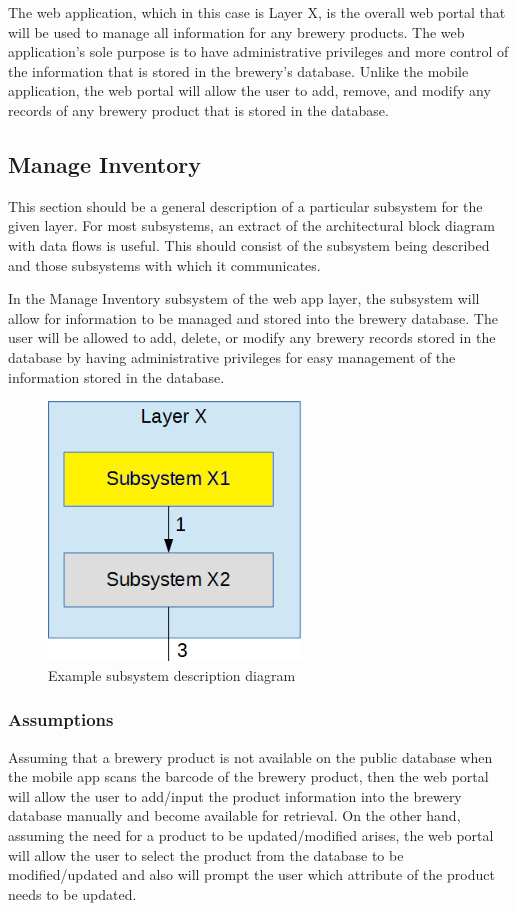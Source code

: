 The web application, which in this case is Layer X, is the overall web portal that will be used to manage all information for any brewery products.  The web application's sole purpose is to have administrative privileges and more control of the information that is stored in the brewery's database.  Unlike the mobile application, the web portal will allow the user to add, remove, and modify any records of any brewery product that is stored in the database.

\subsection{Manage Inventory}
This section should be a general description of a particular subsystem for the given layer. For most subsystems, an extract of the architectural block diagram with data flows is useful. This should consist of the subsystem being described and those subsystems with which it communicates.

In the Manage Inventory subsystem of the web app layer, the subsystem will allow for information to be managed and stored into the brewery database.  The user will be allowed to add, delete, or modify any brewery records stored in the database by having administrative privileges for easy management of the information stored in the database.

\begin{figure}[h!]
	\centering
 	\includegraphics[width=0.60\textwidth]{images/subsystem}
 \caption{Example subsystem description diagram}
\end{figure}

\subsubsection{Assumptions}
Assuming that a brewery product is not available on the public database when the mobile app scans the barcode of the brewery product, then the web portal will allow the user to add/input the product information into the brewery database manually and become available for retrieval.  On the other hand, assuming the need for a product to be updated/modified arises, the web portal will allow the user to select the product from the database to be modified/updated and also will prompt the user which attribute of the product needs to be updated.

